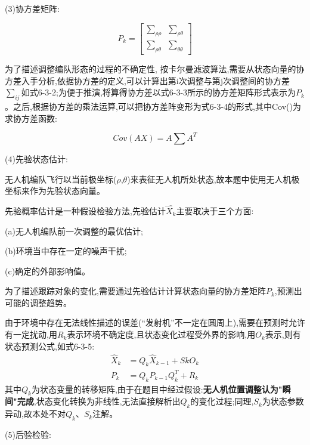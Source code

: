 \documentclass[withoutpreface,bwprint]{cumcmthesis}
\begin{document}
	(3)协方差矩阵:
	
	\begin{equation}
		\tag{6-3-3}
		P_{k} =	\begin{bmatrix}
			\sum_{\rho\rho} &\sum_{\rho\theta} \\
			\sum_{\rho\theta} & \sum_{\theta\theta}
		\end{bmatrix}
	\end{equation}
	
	为了描述调整编队形态的过程的不确定性, 按卡尔曼滤波算法,需要从状态向量的协方差入手分析,依据协方差的定义,可以计算出第i次调整与第j次调整间的协方差$\sum_{ij}$如式6-3-2;为便于推演,将算得协方差以式6-3-3所示的协方差矩阵形式表示为$P_{k}$。之后,根据协方差的乘法运算,可以把协方差阵变形为式6-3-4的形式,其中Cov()为求协方差函数:
	
	\begin{equation}
		\tag{6-3-4}
		Cov(AX) = A\sum A^{T}
	\end{equation}
	
	(4)先验状态估计:
	
	无人机编队飞行以当前极坐标($\rho$,$\theta$)来表征无人机所处状态,故本题中使用无人机极坐标来作为先验状态向量。
	
	先验概率估计是一种假设检验方法,先验估计$\hat{X_{k}}$主要取决于三个方面:
	
	\qquad	(a)无人机编队前一次调整的最优估计;
	
	\qquad (b)环境当中存在一定的噪声干扰;
	
	\qquad (c)确定的外部影响值。
	
	为了描述跟踪对象的变化,需要通过先验估计计算状态向量的协方差矩阵$P_{k}$,预测出可能的调整趋势。
	
	由于环境中存在无法线性描述的误差(“发射机”不一定在圆周上),需要在预测时允许有一定扰动,用$R_{k}$表示环境不确定度,且状态变化过程受外界的影响,用$O_{k}$表示,则有状态预测公式,如式6-3-5:
	\begin{equation}
		\tag{6-3-5}
		\begin{split}
			\hat{X}_{k} &=Q_{k} \hat{X}_{k-1} + S{k}O_{k}\\
			P_{k} &=Q_{k} P_{k-1}Q_{k}^{T} + R_{k}
		\end{split}
	\end{equation}	
	其中$Q_{k}$为状态变量的转移矩阵,由于在题目中经过假设:\textbf{无人机位置调整认为"瞬间"完成},状态变化转换为非线性,无法直接解析出$Q_{k}$的变化过程;同理,$S_{k}$为状态参数异动,故本处不对$Q_{k}$、$S_{k}$注解。
	
	(5)后验检验:
	
\end{document}
